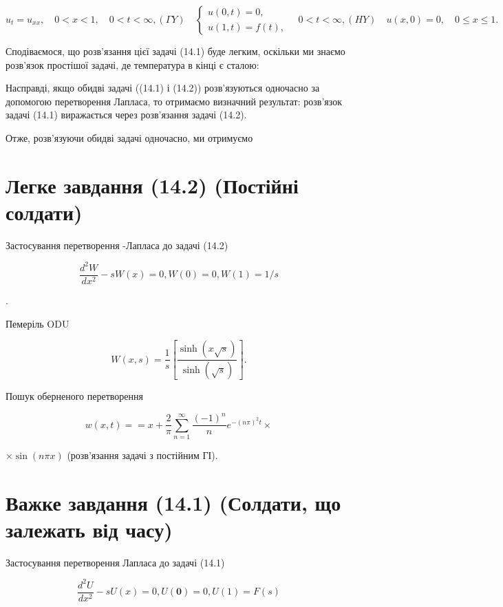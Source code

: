 \documentclass[
  ukrainian,
]{article}
\begin{document}
\[
u_{t} = u_{xx}, \quad 0 < x < 1, \quad 0 < t < \infty,
(\Gamma Y) \quad \begin{cases} u(0, t) = 0, \\ u(1, t) = f(t), \end{cases} \quad 0 < t < \infty,
(HY) \quad u(x, 0) = 0, \quad 0 \le x \le 1.
\]

Сподіваємося, що розв'язання цієї задачі (14.1) буде легким, оскільки ми
знаємо розв'язок простішої задачі, де температура в кінці є сталою:

Насправді, якщо обидві задачі ((14.1) і (14.2)) розв'язуються одночасно
за допомогою перетворення Лапласа, то отримаємо визначний результат:
розв'язок задачі (14.1) виражається через розв'язання задачі (14.2).

Отже, розв'язуючи обидві задачі одночасно, ми отримуємо

\section{Легке завдання (14.2) (Постійні
солдати)}\label{ux43bux435ux433ux43aux435-ux437ux430ux432ux434ux430ux43dux43dux44f-14.2-ux43fux43eux441ux442ux456ux439ux43dux456-ux441ux43eux43bux434ux430ux442ux438}

Застосування перетворення -Лапласа до задачі (14.2)

\[
\frac{d^2W}{dx^2} - sW(x) = 0,
W(0) = 0,
W(1) = 1/s
\]

.

Пемеріль ODU

\[
W(x, s) = \frac{1}{s} \left[ \frac{\sinh(x \sqrt{s})}{\sinh(\sqrt{s})} \right].
\]

Пошук оберненого перетворення

\[
w(x, t) =
= x + \frac{2}{\pi} \sum_{n=1}^{\infty} \frac{(-1)^n}{n} e^{-(n\pi)^2 t} \times
\]

\(\times \sin(n\pi x)\) (розв'язання задачі з постійним ГІ).

\section{Важке завдання (14.1) (Солдати, що залежать від
часу)}\label{ux432ux430ux436ux43aux435-ux437ux430ux432ux434ux430ux43dux43dux44f-14.1-ux441ux43eux43bux434ux430ux442ux438-ux449ux43e-ux437ux430ux43bux435ux436ux430ux442ux44c-ux432ux456ux434-ux447ux430ux441ux443}

Застосування перетворення Лапласа до задачі (14.1)

\[
\frac{d^2U}{dx^2} - sU(x) = 0,
U\left( \mathbf{0}\right) =0,
U(1) = F(s)
\]
\end{document}
